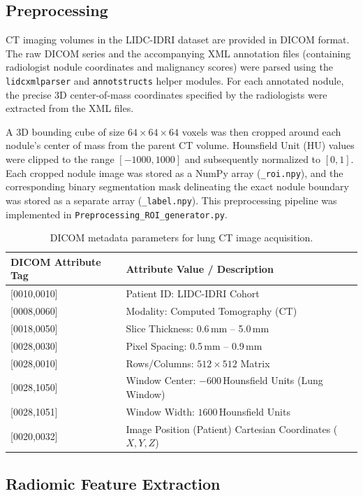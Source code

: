 \documentclass{iopjournal}
\begin{document}
\subsection{Preprocessing}

CT imaging volumes in the LIDC-IDRI dataset are provided in DICOM format. The
raw DICOM series and the accompanying XML annotation files (containing
radiologist nodule coordinates and malignancy scores) were parsed using the
\texttt{lidcxmlparser} and \texttt{annotstructs} helper modules. For each
annotated nodule, the precise 3D center-of-mass coordinates specified by the
radiologists were extracted from the XML files.

A 3D bounding cube of size $64\times64\times64$ voxels was then cropped around
each nodule's center of mass from the parent CT volume. Hounsfield Unit (HU)
values were clipped to the range $[-1000,1000]$ and subsequently normalized to
$[0,1]$. Each cropped nodule image was stored as a NumPy array
(\texttt{\_roi.npy}), and the corresponding binary segmentation mask
delineating the exact nodule boundary was stored as a separate array
(\texttt{\_label.npy}). This preprocessing pipeline was implemented in
\texttt{Preprocessing\_ROI\_generator.py}.

\begin{table}[h]
\centering
\caption{DICOM metadata parameters for lung CT image acquisition.}\label{tab:dicom}
\begin{tabular}{ll}
\toprule
\textbf{DICOM Attribute Tag} & \textbf{Attribute Value / Description} \\
\midrule
{[0010,0010]} & Patient ID: LIDC-IDRI Cohort \\
{[0008,0060]} & Modality: Computed Tomography (CT) \\
{[0018,0050]} & Slice Thickness: 0.6\,mm -- 5.0\,mm \\
{[0028,0030]} & Pixel Spacing: 0.5\,mm -- 0.9\,mm \\
{[0028,0010]} & Rows/Columns: $512 \times 512$ Matrix \\
{[0028,1050]} & Window Center: $-600$\,Hounsfield Units (Lung Window) \\
{[0028,1051]} & Window Width: $1600$\,Hounsfield Units \\
{[0020,0032]} & Image Position (Patient) Cartesian Coordinates ($X, Y, Z$) \\
\bottomrule
\end{tabular}
\end{table}

\subsection{Radiomic Feature Extraction}
\end{document}
